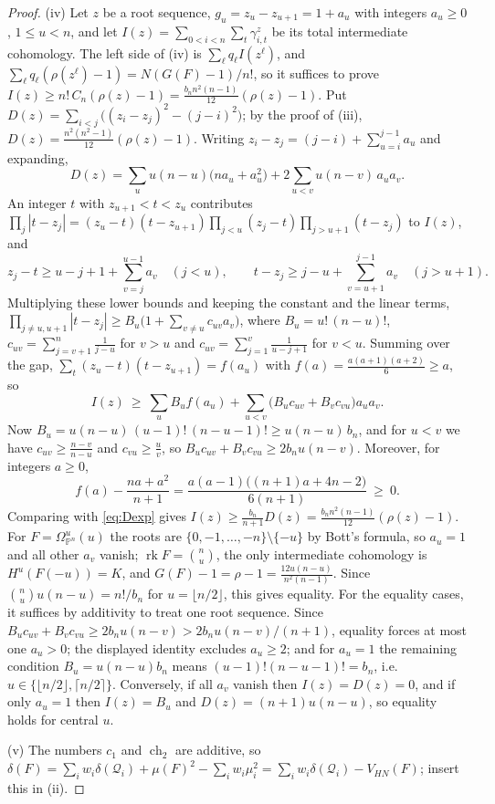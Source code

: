 \documentclass[11pt]{amsart}
\theoremstyle{definition}
\theoremstyle{remark}
\newcommand{\PP}{\mathbb{P}}
\newcommand{\cQ}{\mathcal{Q}}
\DeclareMathOperator{\rk}{rk}
\begin{document}
\begin{proof}
(iv) Let $z$ be a root sequence, $g_u=z_u-z_{u+1}=1+a_u$ with integers $a_u\ge0$, $1\le u<n$, and let $I(z)=\sum_{0<i<n}\sum_t\gamma^z_{i,t}$ be its total intermediate cohomology. The left side of (iv) is $\sum_\ell q_\ell I(z^\ell)$, and $\sum_\ell q_\ell(\rho(z^\ell)-1)=N(G(F)-1)/n!$, so it suffices to prove $I(z)\ge n!\,C_n(\rho(z)-1)=\frac{b_nn^2(n-1)}{12}(\rho(z)-1)$. Put $D(z)=\sum_{i<j}\big((z_i-z_j)^2-(j-i)^2\big)$; by the proof of (iii), $D(z)=\frac{n^2(n^2-1)}{12}(\rho(z)-1)$. Writing $z_i-z_j=(j-i)+\sum_{u=i}^{j-1}a_u$ and expanding,
\begin{equation}\label{eq:Dexp}
D(z)=\sum_uu(n-u)\big(na_u+a_u^2\big)+2\sum_{u<v}u(n-v)\,a_ua_v .
\end{equation}
An integer $t$ with $z_{u+1}<t<z_u$ contributes $\prod_j|t-z_j|=(z_u-t)(t-z_{u+1})\prod_{j<u}(z_j-t)\prod_{j>u+1}(t-z_j)$ to $I(z)$, and
\[
z_j-t\ge u-j+1+\sum_{v=j}^{u-1}a_v\quad(j<u),\qquad t-z_j\ge j-u+\sum_{v=u+1}^{j-1}a_v\quad(j>u+1).
\]
Multiplying these lower bounds and keeping the constant and the linear terms, $\prod_{j\ne u,u+1}|t-z_j|\ge B_u\big(1+\sum_{v\ne u}c_{uv}a_v\big)$, where $B_u=u!\,(n-u)!$, $c_{uv}=\sum_{j=v+1}^n\frac1{j-u}$ for $v>u$ and $c_{uv}=\sum_{j=1}^v\frac1{u-j+1}$ for $v<u$. Summing over the gap, $\sum_t(z_u-t)(t-z_{u+1})=f(a_u)$ with $f(a)=\frac{a(a+1)(a+2)}6\ge a$, so
\[
I(z)\ \ge\ \sum_uB_uf(a_u)+\sum_{u<v}\big(B_uc_{uv}+B_vc_{vu}\big)a_ua_v .
\]
Now $B_u=u(n-u)\,(u-1)!\,(n-u-1)!\ge u(n-u)\,b_n$, and for $u<v$ we have $c_{uv}\ge\frac{n-v}{n-u}$ and $c_{vu}\ge\frac uv$, so $B_uc_{uv}+B_vc_{vu}\ge2b_nu(n-v)$. Moreover, for integers $a\ge0$,
\[
f(a)-\frac{na+a^2}{n+1}=\frac{a(a-1)\big((n+1)a+4n-2\big)}{6(n+1)}\ \ge\ 0 .
\]
Comparing with \eqref{eq:Dexp} gives $I(z)\ge\frac{b_n}{n+1}D(z)=\frac{b_nn^2(n-1)}{12}(\rho(z)-1)$. For $F=\Omega^u_{\PP^n}(u)$ the roots are $\{0,-1,\dots,-n\}\setminus\{-u\}$ by Bott's formula, so $a_u=1$ and all other $a_v$ vanish; $\rk F=\binom nu$, the only intermediate cohomology is $H^u(F(-u))=K$, and $G(F)-1=\rho-1=\frac{12u(n-u)}{n^2(n-1)}$. Since $\binom nu u(n-u)=n!/b_n$ for $u=\lfloor n/2\rfloor$, this gives equality. For the equality cases, it suffices by additivity to treat one root sequence. Since $B_uc_{uv}+B_vc_{vu}\ge2b_nu(n-v)>2b_nu(n-v)/(n+1)$, equality forces at most one $a_u>0$; the displayed identity excludes $a_u\ge2$; and for $a_u=1$ the remaining condition $B_u=u(n-u)b_n$ means $(u-1)!(n-u-1)!=b_n$, i.e.\ $u\in\{\lfloor n/2\rfloor,\lceil n/2\rceil\}$. Conversely, if all $a_v$ vanish then $I(z)=D(z)=0$, and if only $a_u=1$ then $I(z)=B_u$ and $D(z)=(n+1)u(n-u)$, so equality holds for central $u$.

(v) The numbers $c_1$ and $\operatorname{ch}_2$ are additive, so $\delta(F)=\sum_iw_i\delta(\cQ_i)+\mu(F)^2-\sum_iw_i\mu_i^2=\sum_iw_i\delta(\cQ_i)-V_{HN}(F)$; insert this in (ii).
\end{proof}
\end{document}

